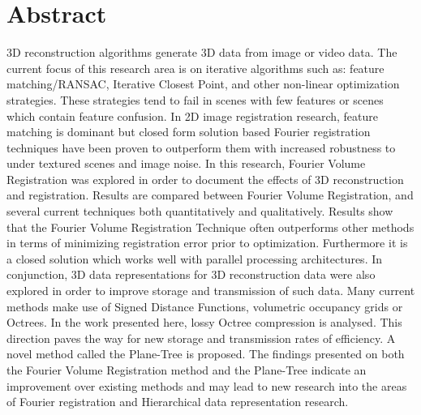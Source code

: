 \makeatletter
\chapter{Abstract}

3D reconstruction algorithms generate 3D data from image or video data. The current focus of this research area is on iterative algorithms such as: feature matching/RANSAC, Iterative Closest Point, and other non-linear optimization strategies. These strategies tend to fail in scenes with few features or scenes which contain feature confusion. In 2D image registration research, feature matching is dominant but closed form solution based Fourier registration techniques have been proven to outperform them with increased robustness to under textured scenes and image noise. In this research, Fourier Volume Registration was explored in order to document the effects of 3D reconstruction and registration. Results are compared between Fourier Volume Registration, and several current techniques both quantitatively and qualitatively. Results show that the Fourier Volume Registration Technique often outperforms other methods in terms of minimizing registration error prior to optimization. Furthermore it is a closed solution which works well with parallel processing architectures. In conjunction, 3D data representations for 3D reconstruction data were also explored in order to improve storage and transmission of such data. Many current methods make use of Signed Distance Functions, volumetric occupancy grids or Octrees. In the work presented here, lossy Octree compression is analysed. This direction paves the way for new storage and transmission rates of efficiency. A novel method called the Plane-Tree is proposed. The findings presented on both the Fourier Volume Registration method and the Plane-Tree indicate an improvement over existing methods and may lead to new research into the areas of Fourier registration and Hierarchical data representation research.


